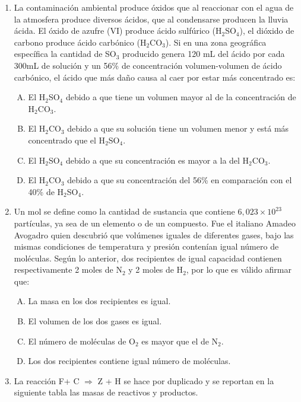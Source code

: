 \begin{enumerate}
\item La contaminación ambiental produce óxidos que al reaccionar con el agua de la atmosfera produce diversos ácidos, que al condensarse producen la lluvia ácida. El óxido de azufre (VI) produce ácido sulfúrico (H$_2$SO$_4$), el dióxido de carbono produce ácido carbónico (H$_2$CO$_3$). Si en una zona geográfica específica la cantidad de SO$_3$ producido genera 120 mL del ácido por cada 300mL de solución y un 56\% de concentración volumen-volumen de ácido carbónico, el ácido que más daño causa al caer por estar más concentrado es: \label{mon-15}

\begin{enumerate}[(A)]
\item El H$_2$SO$_4$ debido a que tiene un volumen mayor al de la concentración de H$_2$CO$_3$.
\item El H$_2$CO$_3$ debido a que su solución tiene un volumen menor y está más concentrado que el H$_2$SO$_4$.
\item El H$_2$SO$_4$ debido a que su concentración es mayor a la del H$_2$CO$_3$.
\item El H$_2$CO$_3$ debido a que su concentración del 56\% en comparación con el 40\% de H$_2$SO$_4$.
\end{enumerate}


\item Un mol se define como la cantidad de sustancia que contiene $6,023 \times 10^{23} $ partículas, ya sea de un elemento o de un compuesto. Fue el italiano Amadeo Avogadro quien descubrió que volúmenes iguales de diferentes gases, bajo las mismas condiciones de temperatura y presión contenían igual número de moléculas. Según lo anterior, dos recipientes de igual capacidad contienen respectivamente 2 moles de N$_2$ y 2 moles de H$_2$, por lo que es válido afirmar que: \label{mon-16}

\begin{enumerate}[(A)]
\item La masa en los dos recipientes es igual.
\item  El volumen de los dos gases es igual.
\item  El número de moléculas de O$_2$ es mayor que el de N$_2$.
\item Los dos recipientes contiene igual número de moléculas.
\end{enumerate}


\item La reacción F+ C  $\Longrightarrow$  Z + H se hace por duplicado y se reportan en la siguiente tabla las masas de reactivos y productos. \label{mon-17}


\end{enumerate}
